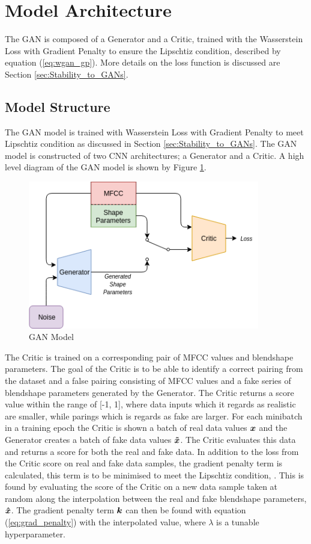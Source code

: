 \section{Model Architecture}
The GAN is composed of a Generator and a Critic, trained with the Wasserstein Loss with Gradient Penalty to ensure the Lipschtiz condition, described by equation (\ref{eq:wgan_gp}).
More details on the loss function is discussed are Section \ref{sec:Stability_to_GANs}.

\subsection{Model Structure}
The GAN model is trained with Wasserstein Loss with Gradient Penalty to meet Lipschtiz condition as discussed in Section \ref{sec:Stability_to_GANs}.
The GAN model is constructed of two CNN architectures; a Generator and a Critic.
A high level diagram of the GAN model is shown by Figure \ref{fig:gan_model}.

\begin{figure}[h!]
    \centering
        \includegraphics[width=0.9\textwidth]{figures/gan/gan.png}
    \caption{GAN Model}\label{fig:gan_model}
\end{figure} 

The Critic is trained on a corresponding pair of MFCC values and blendshape parameters.
The goal of the Critic is to be able to identify a correct pairing from the dataset and a false pairing consisting of MFCC values and a fake series of blendshape parameters generated by the Generator.
The Critic returns a score value within the range of [-1, 1], where data inputs which it regards as realistic are smaller, while parings which is regards as fake are larger.
For each minibatch in a training epoch the Critic is shown a batch of real data values ${\boldsymbol{{x}}}$ and the Generator creates a batch of fake data values ${\boldsymbol{{\tilde{x}}}}$.
The Critic evaluates this data and returns a score for both the real and fake data.
In addition to the loss from the Critic score on real and fake data samples, the gradient penalty term is calculated, this term is to be minimised to meet the Lipschtiz condition, \cite{Gulrajani2017}.
This is found by evaluating the score of the Critic on a new data sample taken at random along the interpolation between the real and fake blendshape parameters, ${\boldsymbol{{\hat{x}}}}$.
The gradient penalty term ${\boldsymbol{{k}}}$ can then be found with equation (\ref{eq:grad_penalty}) with the interpolated value, where $\lambda$ is a tunable hyperparameter.

